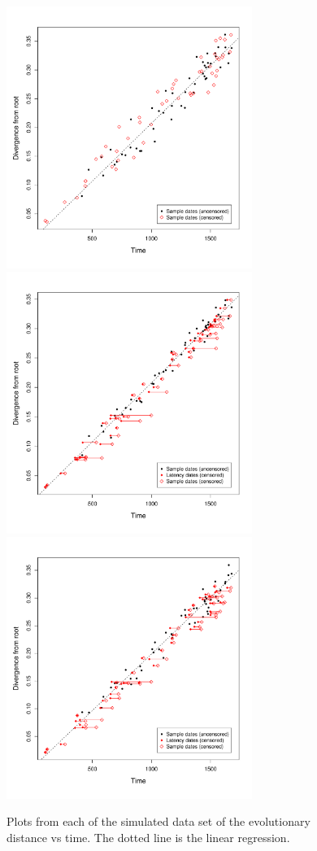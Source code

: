 \documentclass[12pt]{article}
\begin{document}
\begin{figure}[p]
	\centering
	\includegraphics[width=8cm]{figures/simulated.pdf}\\
	\includegraphics[width=8cm]{figures/simulated_latent1.pdf}
	\includegraphics[width=8cm]{figures/simulated_latent2.pdf}\\
	\caption[Simulated Data]{Plots from each of the simulated data set of the evolutionary distance vs time. The dotted line is the linear regression.}
	 \label{fig:results1}
\end{figure}
\end{document}
